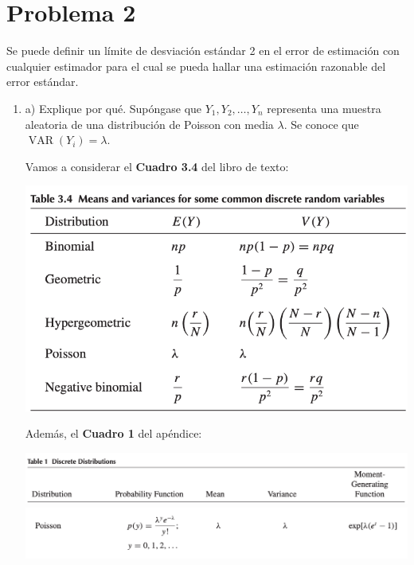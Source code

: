 \section{Problema 2}
Se puede definir un límite de desviación estándar 2 en el error de estimación con cualquier estimador para el cual se pueda hallar una estimación razonable del error estándar.
\begin{enumerate}
\item  a) Explique por qué. Supóngase que $Y_{1}, Y_{2}, \ldots, Y_{n}$ representa una muestra aleatoria de una distribución de Poisson con media $\lambda$. Se conoce que $\operatorname{VAR}\left(Y_{i}\right)=\lambda$.
\begin{solution}
    Vamos a considerar el \textbf{Cuadro 3.4} del libro de texto:
    \begin{center}
        \includegraphics[scale=0.5]{Images/Problema2-1.png}
    \end{center}
    
    Además, el \textbf{Cuadro 1} del apéndice: 
    \begin{center}
        \includegraphics[scale=0.35]{Images/Problema2-2.png}
        \includegraphics[scale=0.35]{Images/Problema2-3.png}
    \end{center}
    
    \linea
    

\end{solution}
\end{enumerate}
